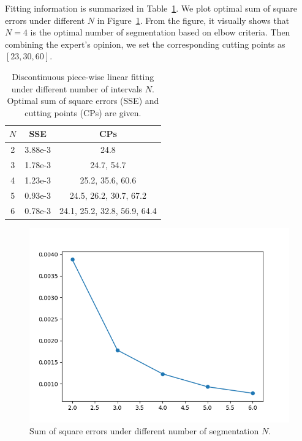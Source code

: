 \documentclass{article}
\begin{document}
Fitting information is summarized in Table~\ref{age_segmentation}. We plot optimal sum of square errors under different $N$ in Figure~\ref{age_segmentation_plot}. From the figure, it visually shows that $N=4$ is the optimal number of segmentation based on elbow criteria. Then combining the expert's opinion, we set the corresponding cutting points as $[23,30,60]$. 

\begin{table}[ht!]
	\centering
	\caption{Discontinuous piece-wise linear fitting under different number of intervals $N$. Optimal sum of square errors (SSE) and cutting points (CPs) are given.}
	\label{age_segmentation}
	\begin{tabular}{|c|c|c|}
		\hline
		$N$ & SSE & CPs\\
		\hline
		2 & 3.88e-3 & 24.8 \\
		\hline
		3 & 1.78e-3 & 24.7, 54.7 \\
		\hline
		4 & 1.23e-3 & 25.2, 35.6, 60.6  \\
		\hline
		5 & 0.93e-3 & 24.5, 26.2, 30.7, 67.2 \\
		\hline
		6 & 0.78e-3 & 24.1, 25.2, 32.8, 56.9, 64.4 \\
		\hline
	\end{tabular}
\end{table}

\begin{figure}[ht!]
	\centering
	\includegraphics[scale=0.5]{pic/hmm/sse_vs_n}
	\caption{Sum of square errors under different number of segmentation $N$.}
	\label{age_segmentation_plot}
\end{figure}
\end{document}
